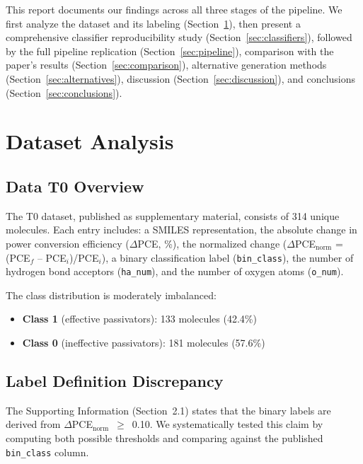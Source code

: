 \documentclass[11pt,a4paper]{article}
\begin{document}
This report documents our findings across all three stages of the pipeline. We first analyze the dataset and its labeling (Section~\ref{sec:dataset}), then present a comprehensive classifier reproducibility study (Section~\ref{sec:classifiers}), followed by the full pipeline replication (Section~\ref{sec:pipeline}), comparison with the paper's results (Section~\ref{sec:comparison}), alternative generation methods (Section~\ref{sec:alternatives}), discussion (Section~\ref{sec:discussion}), and conclusions (Section~\ref{sec:conclusions}).

\section{Dataset Analysis}
\label{sec:dataset}

\subsection{Data T0 Overview}

The T0 dataset, published as supplementary material, consists of 314 unique molecules. Each entry includes: a SMILES representation, the absolute change in power conversion efficiency ($\Delta$PCE, \%), the normalized change ($\Delta$PCE$_\text{norm}$ = (PCE$_f$ -- PCE$_i$)/PCE$_i$), a binary classification label (\texttt{bin\_class}), the number of hydrogen bond acceptors (\texttt{ha\_num}), and the number of oxygen atoms (\texttt{o\_num}).

The class distribution is moderately imbalanced:
\begin{itemize}[nosep]
    \item \textbf{Class 1} (effective passivators): 133 molecules (42.4\%)
    \item \textbf{Class 0} (ineffective passivators): 181 molecules (57.6\%)
\end{itemize}

\subsection{Label Definition Discrepancy}
\label{sec:label_discrepancy}

The Supporting Information (Section~2.1) states that the binary labels are derived from $\Delta$PCE$_\text{norm}$~$\geq$~0.10. We systematically tested this claim by computing both possible thresholds and comparing against the published \texttt{bin\_class} column.
\end{document}

